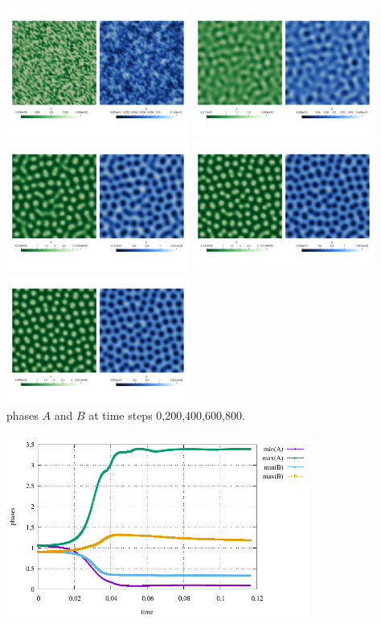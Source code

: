 \begin{center}
\includegraphics[width=6cm]{python_codes/fieldstone_130/results/AB_000}
\includegraphics[width=6cm]{python_codes/fieldstone_130/results/AB_200}
\includegraphics[width=6cm]{python_codes/fieldstone_130/results/AB_400}
\includegraphics[width=6cm]{python_codes/fieldstone_130/results/AB_600}
\includegraphics[width=6cm]{python_codes/fieldstone_130/results/AB_800}\\
{\captionfont phases $A$ and $B$ at time steps 0,200,400,600,800.}
\end{center}


\begin{center}
\includegraphics[width=10cm]{python_codes/fieldstone_130/results/stats_AB}
\end{center}
